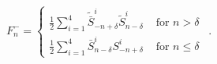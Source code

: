 \begin{equation}
F^-_n = \left\{  \begin{array}{ll} 
\frac{1}{2} \sum_{i=1}^4 
\tilde{\bar{S}}_{-n+\delta}^i \tilde{S}_{n-\delta}^i  
& \mbox{ for } n > \delta \\
\frac{1}{2} \sum_{i=1}^4 
\bar{S}_{n-\delta}^i S_{-n+\delta}^i 
& \mbox{ for } n \leq \delta
\end{array} \right. \ \ .
\end{equation}

